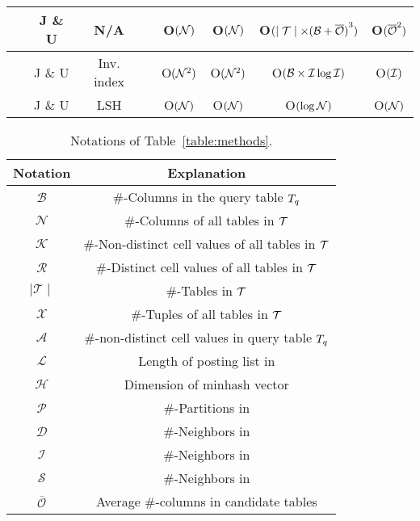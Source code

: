 \begin{table*}[t]
\begin{tabular}{|c|c|c|c|cccc|}
		\hline
		\frt~\cite{Frt12} & J \& U & N/A & \XSolidBrush &  O$(\mathcal{N})$        & O$(\mathcal{N})$    & O$( \mid \mathcal{T} \mid \times {(\mathcal{B}+ \overline{\mathcal{O}})}^3)$               & O$({\overline{\mathcal{O}}}^2)$    \\
		\hline
		\infogather~\cite{InfoGather} & J \& U & Inv. index & \XSolidBrush & O$(\mathcal{N}^2)$   & O$(\mathcal{N}^2)$    & O$(\mathcal{B} \times \mathcal{I} \log \mathcal{I})$              & O$(\mathcal{I} )$   \\
		\hline
		\cc{\aurum~\cite{Aurum}} & J \& U & LSH & \Checkmark  & O$(\mathcal{N})$         & O$(\mathcal{N})$                   & O$(\log \mathcal{N})$                & O$(\mathcal{N})$   \\
		\hline
		
		
	\end{tabular}
	\label{table:methods}
	
\end{table*}

\begin{table}[!ht]
	\centering
	\caption{ Notations of Table~\ref{table:methods}.}
	\begin{tabular}{|c|c|}
		\hline
		Notation & Explanation \\ \hline
		$\mathcal{B}$ & \#-Columns in the query table $T_q$  \\\hline
		$\mathcal{N}$ &\#-Columns of all tables in $\mathcal{T}$ \\\hline
		$\mathcal{K}$ & \#-Non-distinct cell values of all tables in $\mathcal{T}$   \\\hline
		$\mathcal{R}$ &\#-Distinct cell values of all tables in $\mathcal{T}$ \\\hline
		$\mid \mathcal{T} \mid$ & \#-Tables in $\mathcal{T}$  \\\hline
		$\mathcal{X}$ &\#-Tuples of all tables in $\mathcal{T}$ \\\hline
		$\mathcal{A}$ & \#-non-distinct cell values in query table $T_q$  \\\hline
		
		$\mathcal{L}$ & Length of posting list in \josie  \\\hline
		
		$\mathcal{H}$ & Dimension of minhash vector \\\hline
		$\mathcal{P}$ & \#-Partitions in \lsh\\\hline
		$\mathcal{D}$ & \#-Neighbors in \dlll\\\hline
		$\mathcal{I}$ & \#-Neighbors in \infogather\\\hline
		$\mathcal{S}$ & \#-Neighbors in \santos\\\hline
		$\overline{\mathcal{O}}$ & Average  \#-columns in candidate tables
		\\ \hline
		
		
		
	\end{tabular}
	\label{symbol_table}
\end{table}

